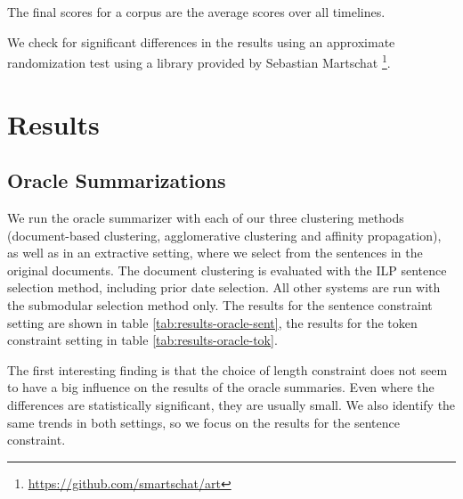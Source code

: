 \documentclass[a4paper,BCOR=10mm]{report}
\numberwithin{lemma}{chapter}
\numberwithin{definition}{chapter}
\begin{document}
The final scores for a corpus are the average scores over all timelines.

We check for significant differences in the results using an approximate randomization test \citep{art} using a library provided by Sebastian Martschat \footnote{\url{https://github.com/smartschat/art}}. %

\section{Results}

\subsection{Oracle Summarizations}

We run the oracle summarizer with each of our three clustering methods (document-based clustering, agglomerative clustering and affinity propagation), as well as in an extractive setting, where we select from the sentences in the original documents.
The document clustering is evaluated with the ILP sentence selection method, including prior date selection.%
All other systems are run with the submodular selection method only.
The results for the sentence constraint setting are shown in table \ref{tab:results-oracle-sent}, the results for the token constraint setting in table \ref{tab:results-oracle-tok}.

The first interesting finding is that the choice of length constraint does not seem to have a big influence on the results of the oracle summaries. Even where the differences are statistically significant, they are usually small.
We also identify the same trends in both settings, so we focus on the results for the sentence constraint.
\end{document}

